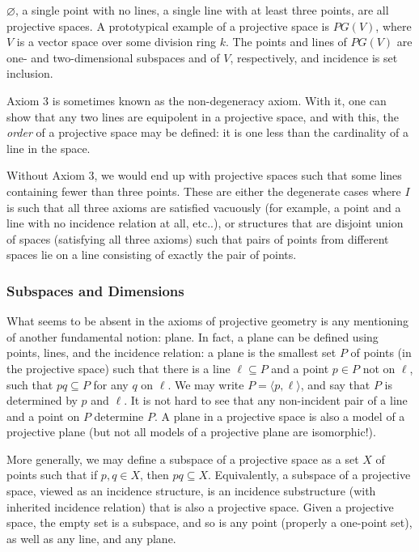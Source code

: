 \documentclass[12pt]{article}
\begin{document}
$\varnothing$, a single point with no lines, a single line with at least three points, are all projective spaces.  A prototypical example of a projective space is $PG(V)$, where $V$ is a vector space over some division ring $k$.  The points and lines of $PG(V)$ are one- and two-dimensional subspaces and of $V$, respectively, and incidence is set inclusion.

Axiom 3 is sometimes known as the non-degeneracy axiom.  With it, one can show that any two lines are equipolent in a projective space, and with this, the \emph{order} of a projective space may be defined: it is one less than the cardinality of a line in the space.

Without Axiom 3, we would end up with projective spaces such that some lines containing fewer than three points.  These are either the degenerate cases where $I$ is such that all three axioms are satisfied vacuously (for example, a point and a line with no incidence relation at all, etc..), or structures that are disjoint union of spaces (satisfying all three axioms) such that pairs of points from different spaces lie on a line consisting of exactly the pair of points.

\subsubsection*{Subspaces and Dimensions}

What seems to be absent in the axioms of projective geometry is any mentioning of another fundamental notion: plane.  In fact, a plane can be defined using points, lines, and the incidence relation: a plane is the smallest set $P$ of points (in the projective space) such that there is a line $\ell \subseteq P$ and a point $p\in P$ not on $\ell$, such that $pq\subseteq P$ for any $q$ on $\ell$.  We may write $P=\langle p,\ell\rangle$, and say that $P$ is determined by $p$ and $\ell$.  It is not hard to see that any non-incident pair of a line and a point on $P$ determine $P$.  A plane in a projective space is also a model of a projective plane (but not all models of a projective plane are isomorphic!).

More generally, we may define a subspace of a projective space as a set $X$ of points such that if $p,q\in X$, then $pq\subseteq X$.  Equivalently, a subspace of a projective space, viewed as an incidence structure, is an incidence substructure (with inherited incidence relation) that is also a projective space.  Given a projective space, the empty set is a subspace, and so is any point (properly a one-point set), as well as any line, and any plane.
\end{document}
